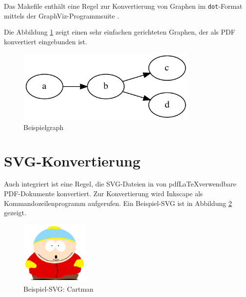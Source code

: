 Das Makefile enthält eine Regel zur Konvertierung von Graphen im \texttt{dot}-Format mittels
der GraphViz-Programmsuite \cite{gansner2000open}.

Die Abbildung \ref{fig:dotgraph} zeigt einen sehr einfachen gerichteten Graphen,
der als PDF konvertiert eingebunden ist.

\begin{figure}[!ht]
    \centering
    \caption{Beispielgraph}
    \label{fig:dotgraph}
    \includegraphics[width=0.8\textwidth]{img/examplegraph}
\end{figure}

\section{SVG-Konvertierung}

Auch integriert ist eine Regel, die SVG-Dateien in von pdf\LaTeX verwendbare PDF-Dokumente konvertiert. Zur Konvertierung wird Inkscape\cite{inkscape} als Kommandozeilenprogramm aufgerufen.
Ein Beispiel-SVG ist in Abbildung \ref{fig:cartman} gezeigt.

\begin{figure}[!ht]
    \centering
    \caption{Beispiel-SVG: Cartman}
    \label{fig:cartman}
    \includegraphics[width=0.3\textwidth]{img/cartman}
\end{figure}

